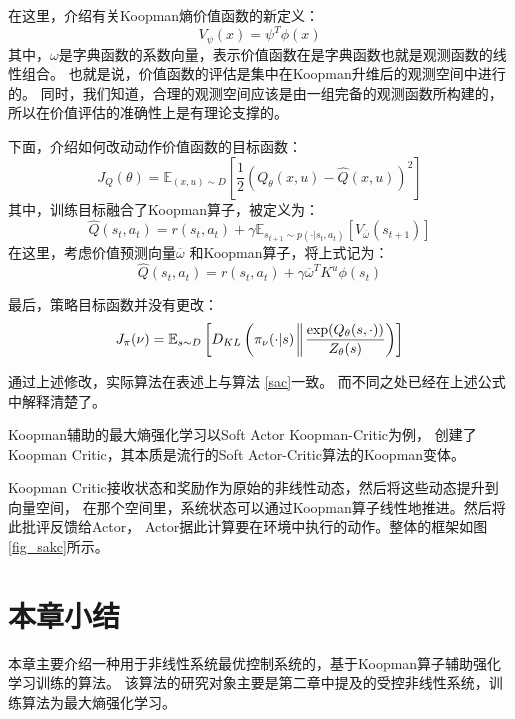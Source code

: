 \documentclass[AutoFakeBold]{LZUThesis}
\begin{document}
在这里，介绍有关Koopman熵价值函数的新定义：
\begin{equation}
  V_\psi(x) = \psi^T \phi(x)
\end{equation}
其中，$\omega$是字典函数的系数向量，表示价值函数在是字典函数也就是观测函数的线性组合。
也就是说，价值函数的评估是集中在Koopman升维后的观测空间中进行的。
同时，我们知道，合理的观测空间应该是由一组完备的观测函数所构建的，
所以在价值评估的准确性上是有理论支撑的。

下面，介绍如何改动动作价值函数的目标函数：
\begin{equation}
  J_Q(\theta) = \mathbb{E}_{(x, u) \sim D} \left[ \frac12 \left( 
  Q_\theta(x, u) - \hat{Q}(x, u) \right)^2 \right]
\end{equation}
其中，训练目标融合了Koopman算子，被定义为：
\begin{equation}
  \hat{Q}(s_t, a_t) = r(s_t, a_t) + 
  \gamma \mathbb{E}_{s_{t + 1} \sim p(\cdot | s_t, a_t)}
  \left[ V_{\overline{\omega}}(s_{t + 1}) \right]
  \label{Koopman-critic}
\end{equation}
在这里，考虑价值预测向量$\overline{\omega}$
和Koopman算子，将上式记为：
\begin{equation}
  \hat{Q}(s_t, a_t) = r(s_t, a_t) +
  \gamma \overline{\omega}^T K^u \phi(s_t)
\end{equation}

最后，策略目标函数并没有更改：
\begin{equation}
  J_\pi(\nu) = \mathbb{E}_{s \sim D}
  \left[ D_{KL}\left( \pi_{\nu}(\cdot | s)
  \bigg\Arrowvert
  \frac{\exp(Q_\theta(s, \cdot))}
  {Z_\theta(s)} \right) \right]
\end{equation}

通过上述修改，实际算法在表述上与算法 \ref{sac}一致。
而不同之处已经在上述公式中解释清楚了。


Koopman辅助的最大熵强化学习以Soft Actor Koopman-Critic为例，
创建了Koopman Critic，其本质是流行的Soft Actor-Critic算法的Koopman变体。

Koopman Critic接收状态和奖励作为原始的非线性动态，然后将这些动态提升到向量空间，
在那个空间里，系统状态可以通过Koopman算子线性地推进。然后将此批评反馈给Actor，
Actor据此计算要在环境中执行的动作。整体的框架如图 \ref{fig_sakc}所示。


\section{本章小结}
本章主要介绍一种用于非线性系统最优控制系统的，基于Koopman算子辅助强化学习训练的算法。
该算法的研究对象主要是第二章中提及的受控非线性系统，训练算法为最大熵强化学习。
\end{document}
